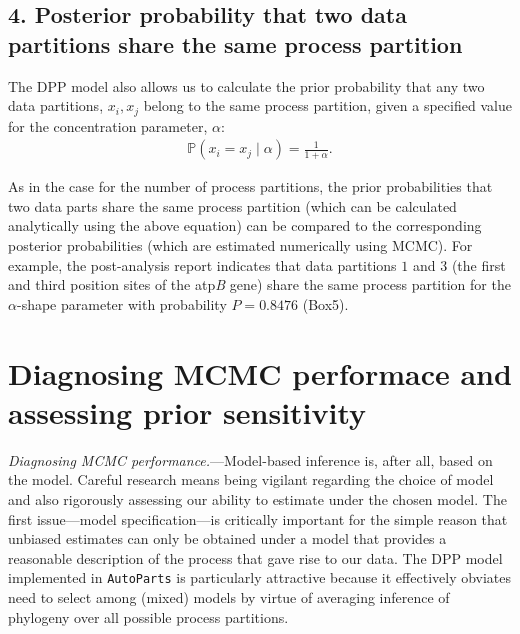 \documentclass[11pt]{article}
\begin{document}
\bigskip
\subsection*{4. Posterior probability that two data partitions share the same process partition}

The DPP model also allows us to calculate the prior probability that any two data partitions, $x_i, x_j$ belong to the same process partition, given a specified value for the concentration parameter, $\alpha$:
\begin{align} \label{eq:P(x_i=x_j)}
\mathbb{P}(x_i = x_j \mid \alpha) = \frac{1}{1+\alpha}.
\end{align}

As in the case for the number of process partitions, the prior probabilities that two data parts share the same process partition (which can be calculated analytically using the above equation) can be compared to the corresponding posterior probabilities (which are estimated numerically using MCMC). 
For example, the post-analysis report indicates that data partitions $1$ and $3$ (the first and third position sites of the atp\emph{B} gene) share the same process partition for the $\alpha$-shape parameter with probability $P = 0.8476$ (Box5).


\bigskip
\section*{Diagnosing MCMC performace and assessing prior sensitivity} \vspace{-1.1mm}

\emph{Diagnosing MCMC performance.}---Model-based inference is, after all, based on the model. 
Careful research means being vigilant regarding the choice of model and also rigorously assessing our ability to estimate under the chosen model. 
The first issue---model specification---is critically important for the simple reason that unbiased estimates can only be obtained under a model that provides a reasonable description of the process that gave rise to our data. 
The DPP model implemented in \verb!AutoParts!  is particularly attractive because it effectively obviates need to select among (mixed) models by virtue of averaging inference of phylogeny over all possible process partitions. \vspace{-1.7mm}
\end{document}
